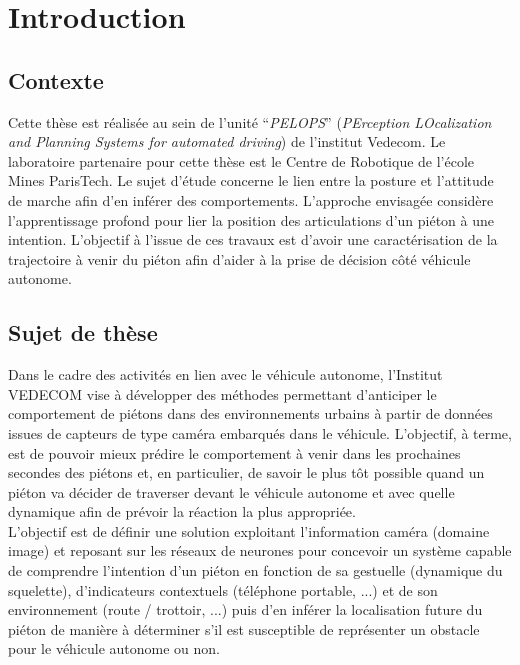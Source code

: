\clearpage
\chapter{Introduction}
\label{sec:Intro}

\section{Contexte}
Cette thèse est réalisée au sein de l’unité “\textit{PELOPS}” (\textit{PErception LOcalization and Planning Systems for automated driving}) de l'institut Vedecom. Le laboratoire partenaire pour cette thèse est le Centre de Robotique de l'école Mines ParisTech. Le sujet d’étude concerne le lien entre la posture et l’attitude de marche afin d’en inférer des comportements. L’approche envisagée considère l’apprentissage profond pour lier la position des articulations d’un piéton à une intention. L’objectif à l’issue de ces travaux est d’avoir une caractérisation de la trajectoire à venir du piéton afin d’aider à la prise de décision côté véhicule autonome.

\section{Sujet de thèse}
\label{sujetdethes}
Dans le cadre des activités en lien avec le véhicule autonome, l’Institut VEDECOM vise à développer des méthodes permettant d’anticiper le comportement de piétons dans des environnements urbains à partir de données issues de capteurs de type caméra embarqués dans le véhicule. L’objectif, à terme, est de pouvoir mieux prédire le comportement à venir dans les prochaines secondes des piétons et, en particulier, de savoir le plus tôt possible quand un piéton va décider de traverser devant le véhicule autonome et avec quelle dynamique afin de prévoir la réaction la plus appropriée.\\

L'objectif est de définir une solution exploitant l’information caméra (domaine image) et reposant sur les réseaux de neurones pour concevoir un système capable de comprendre l’intention d’un piéton en fonction de sa gestuelle (dynamique du squelette), d'indicateurs contextuels (téléphone portable, ...) et de son environnement (route / trottoir, ...) puis d’en inférer la localisation future du piéton de manière à déterminer s’il est susceptible de représenter un obstacle pour le véhicule autonome ou non.

